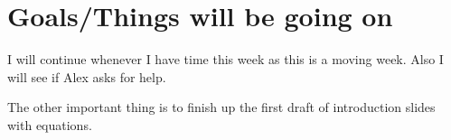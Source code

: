 \documentclass{article}
\begin{document}
\section{Goals/Things will be going on}
I will continue whenever I have time this week as this is a moving week. Also I will see if
Alex asks for help.

The other important thing is to finish up the first draft of introduction slides with equations.





%
%
%

\end{document}
